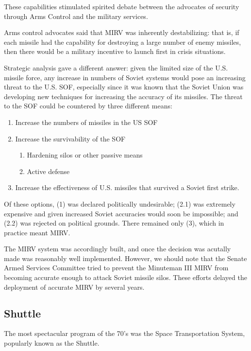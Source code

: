 These capabilities stimulated spirited debate between the advocates of security through Arms Control and the military services.

Arms control advocates said that MIRV was inherently destabilizing: that is, if each missile had the capability for destroying a large number of enemy missiles, then there would be a military incentive to launch first in crisis situations.

Strategic analysis gave a different answer: given the limited size of the U.S. missile force, any increase in numbers of Soviet systems would pose an increasing threat to the U.S. SOF, especially since it was known that the Soviet Union was developing new techniques for increasing the accuracy of its missiles. The threat to the SOF could be countered by three different means:

\begin{enumerate}[label*=\arabic*.]
    \item Increase the numbers of missiles in the US SOF
    \item Increase the survivability of the SOF
    \begin{enumerate}[label*=\arabic*.]
        \item Hardening silos or other passive means
        \item Active defense
    \end{enumerate}
    \item Increase the effectiveness of U.S. missiles that survived a Soviet first strike.
\end{enumerate}

Of these options, (1) was declared politically undesirable; (2.1) was extremely expensive and given increased Soviet accuracies would soon be impossible; and (2.2) was rejected on political grounds. There remained only (3), which in practice meant MIRV.

The MIRV system was accordingly built, and once the decision was acutally made was reasonably well implemented. However, we should note that the Senate Armed Services Committee tried to prevent the Minuteman III MIRV from becoming accurate enough to attack Soviet missile silos. These efforts delayed the deployment of accurate MIRV by several years.

\subsection{Shuttle}
The most spectacular program of the 70's was the Space Transportation System, popularly known as the Shuttle.

